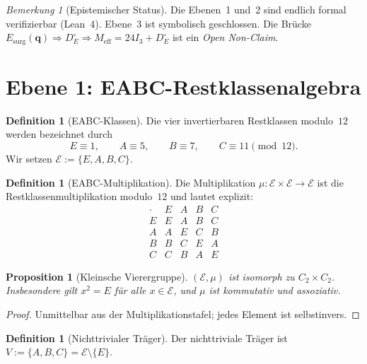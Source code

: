 \documentclass[11pt,a4paper]{article}
\newtheorem{proposition}[theorem]{Proposition}
\theoremstyle{definition}
\newtheorem{definition}[theorem]{Definition}
\theoremstyle{remark}
\newtheorem{remark}[theorem]{Bemerkung}
\newcommand{\E}{\mathcal{E}}
\newcommand{\qq}{\mathbf{q}}
\newcommand{\Esurg}{E_{\mathrm{surg}}}
\begin{document}
	\begin{remark}[Epistemischer Status]
		\label{rem:status}
		Die Ebenen~1 und~2 sind endlich formal verifizierbar (Lean~4).
		Ebene~3 ist symbolisch geschlossen.
		Die Brücke
		$\Esurg(\qq)\Longrightarrow D_E^\circ\Longrightarrow M_{\mathrm{eff}}=24I_3+D_E^\circ$
		ist ein \emph{Open Non-Claim}.
	\end{remark}
	
	\section{Ebene 1: EABC-Restklassenalgebra}
	\label{sec:eabc}
	
	\begin{definition}[EABC-Klassen]
		\label{def:eabc}
		Die vier invertierbaren Restklassen modulo~$12$ werden bezeichnet durch
		\[
		E\equiv 1,\qquad A\equiv 5,\qquad B\equiv 7,\qquad C\equiv 11\pmod{12}.
		\]
		Wir setzen $\E:=\{E,A,B,C\}$.
	\end{definition}
	
	\begin{definition}[EABC-Multiplikation]
		\label{def:mul}
		Die Multiplikation $\mu:\E\times\E\to\E$ ist die Restklassenmultiplikation
		modulo~$12$ und lautet explizit:
		\[
		\begin{array}{c|cccc}
			\cdot & E & A & B & C \\ \hline
			E & E & A & B & C \\
			A & A & E & C & B \\
			B & B & C & E & A \\
			C & C & B & A & E
		\end{array}
		\]
	\end{definition}
	
	\begin{proposition}[Kleinsche Vierergruppe]
		\label{prop:klein}
		$(\E,\mu)$ ist isomorph zu $C_2\times C_2$. Insbesondere gilt
		$x^2=E$ für alle $x\in\E$, und $\mu$ ist kommutativ und assoziativ.
	\end{proposition}
	
	\begin{proof}
		Unmittelbar aus der Multiplikationstafel; jedes Element ist selbstinvers.
	\end{proof}
	
	\begin{definition}[Nichttrivialer Träger]
		\label{def:V}
		Der nichttriviale Träger ist
		$V:=\{A,B,C\}=\E\setminus\{E\}$.
	\end{definition}
	
\end{document}
